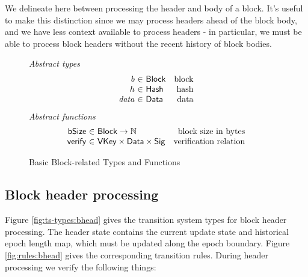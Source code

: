 \documentclass[11pt,a4paper]{article}
\newcommand{\var}[1]{\mathit{#1}}
\newcommand{\fun}[1]{\mathsf{#1}}
\newcommand{\type}[1]{\mathsf{#1}}
\newcommand{\totalf}{\to}
\newcommand{\Hash}{\type{Hash}}  %
\newcommand{\Block}{\type{Block}}
\newcommand{\VKey}{\type{VKey}}
\newcommand{\Sig}{\type{Sig}}
\newcommand{\Data}{\type{Data}}
\newcommand{\bsizename}{bSize}
\newcommand{\verifyname}{verify}
\begin{document}
\newcommand{\bheadname}{bHead}
\newcommand{\bhead}[1]{\fun{\bheadname}\ #1}
\newcommand{\bupdpayloadname}{bUpdPayload}
\newcommand{\bupdpayload}[1]{\fun{\bupdpayloadname}\ #1}

\newcommand{\bslotname}{bSlot}
\newcommand{\bslot}[1]{\fun{\bslotname}\ #1}

\newcommand{\butxo}[1]{\fun{bUtxo}\ #1}

\newcommand{\UTxO}{\type{UTxO}}
\newcommand{\DIEnv}{\type{DIEnv}}
\newcommand{\DIState}{\type{DIState}}

We delineate here between processing the header and body of a block. It's useful
to make this distinction since we may process headers ahead of the
block body, and we have less context available to process headers - in
particular, we must be able to process block headers without the recent history
of block bodies.

\begin{figure}[ht]
  \emph{Abstract types}
  \begin{equation*}
    \begin{array}{r@{~\in~}lr}
      b & \Block & \text{block} \\
      h & \Hash   & \text{hash} \\
      \var{data} & \Data    & \text{data}
    \end{array}
  \end{equation*}
  \emph{Abstract functions}
  \begin{equation*}
    \begin{array}{r@{~\in~}lr}
      \fun{\bsizename} & \Block \totalf \mathbb{N} & \text{block size in bytes} \\
      \fun{\verifyname} & \VKey \times \Data \times \Sig & \text{verification relation} \\
    \end{array}
  \end{equation*}
  \caption{Basic Block-related Types and Functions}
  \label{fig:block-defs}
\end{figure}

\subsection{Block header processing}

Figure \ref{fig:ts-types:bhead} gives the transition system types for block
header processing. The header state contains the current update state and
historical epoch length map, which must be updated along the epoch boundary.
Figure \ref{fig:rules:bhead} gives the corresponding transition rules. During
header processing we verify the following things:
\end{document}
